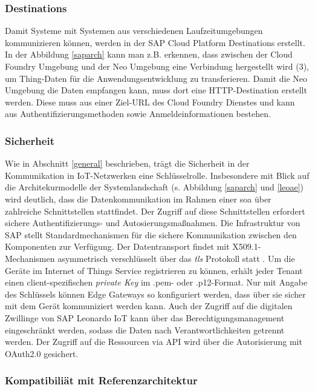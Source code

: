 \subsubsection{Destinations}

Damit Systeme mit Systemen aus verschiedenen Laufzeitumgebungen kommunizieren können, werden in der SAP Cloud Platform Destinations erstellt. In der Abbildung \ref{saparch} kann man z.B. erkennen, dass zwischen der Cloud Foundry Umgebung und der Neo Umgebung eine Verbindung hergestellt wird (3), um Thing-Daten für die Anwendungsentwicklung zu transferieren. Damit die Neo Umgebung die Daten empfangen kann, muss dort eine HTTP-Destination erstellt werden. Diese muss aus einer Ziel-URL des Cloud Foundry Dienstes und kann aus Authentifizierungsmethoden sowie Anmeldeinformationen bestehen.

\subsubsection{Sicherheit}

Wie in Abschnitt \ref{general} beschrieben, trägt die Sicherheit in der Kommunikation in IoT-Netzwerken eine Schlüsselrolle. Insbesondere mit Blick auf die Architekurmodelle der Systemlandschaft (s. Abbildung \ref{saparch} und \ref{leoae}) wird deutlich, dass die Datenkommunikation im Rahmen einer \ac{soa} über zahlreiche Schnittstellen stattfindet. Der Zugriff auf diese Schnittstellen erfordert sichere Authentifizierungs- und Autosierungsmaßnahmen. Die Infrastruktur von SAP stellt Standardmechanismen für die sichere Kommunikation zwischen den Komponenten zur Verfügung. Der Datentransport findet mit X509.1-Mechanismen asymmetrisch verschlüsselt über das \textit{\ac{tls}} Protokoll statt \citep{SAP2020a}. Um die Geräte im Internet of Things Service registrieren zu können, erhält jeder Tenant einen client-spezifischen \textit{private Key} im .pem- oder .p12-Format. Nur mit Angabe des Schlüssels können Edge Gateways so konfiguriert werden, dass über sie sicher mit dem Gerät kommuniziert werden kann. Auch der Zugriff auf die digitalen Zwillinge von SAP Leonardo IoT kann über das Berechtigungsmanagement eingeschränkt werden, sodass die Daten nach Verantwortlichkeiten getrennt werden. Der Zugriff auf die Ressourcen via API wird über die Autorisierung mit OAuth2.0 gesichert.

\subsubsection{Kompatibiliät mit Referenzarchitektur}

